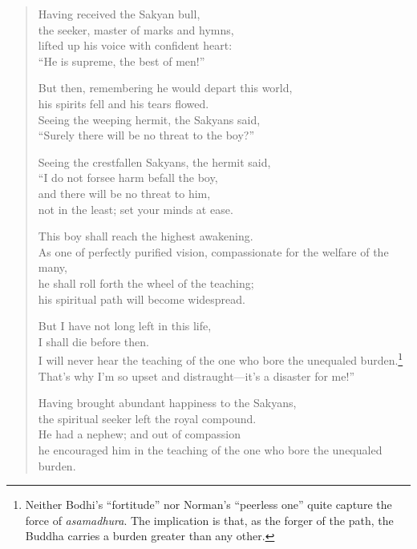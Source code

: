 \documentclass[12pt,openany]{book}%
\begin{document}
\begin{verse}
Having received the Sakyan bull, \\
the seeker, master of marks and hymns, \\
lifted up his voice with confident heart: \\
“He is supreme, the best of men!” 

But then, remembering he would depart this world, \\
his spirits fell and his tears flowed. \\
Seeing the weeping hermit, the Sakyans said, \\
“Surely there will be no threat to the boy?” 

Seeing the crestfallen Sakyans, the hermit said, \\
“I do not forsee harm befall the boy, \\
and there will be no threat to him, \\
not in the least; set your minds at ease. 

This boy shall reach the highest awakening. \\
As one of perfectly purified vision, compassionate for the welfare of the many, \\
he shall roll forth the wheel of the teaching; \\
his spiritual path will become widespread. 

But I have not long left in this life, \\
I shall die before then. \\
I will never hear the teaching of the one who bore the unequaled burden.\footnote{Neither Bodhi’s “fortitude” nor Norman’s “peerless one” quite capture the force of \textit{asamadhura}. The implication is that, as the forger of the path, the Buddha carries a burden greater than any other. } \\
That’s why I’m so upset and distraught—it’s a disaster for me!” 

Having brought abundant happiness to the Sakyans, \\
the spiritual seeker left the royal compound. \\
He had a nephew; and out of compassion \\
he encouraged him in the teaching of the one who bore the unequaled burden. 


\end{verse}
\end{document}
